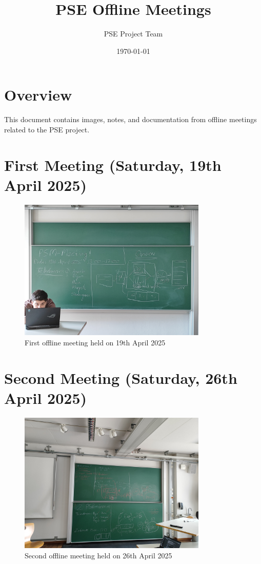 \documentclass{article}
\title{PSE Offline Meetings}
\author{PSE Project Team}
\date{\today}
\begin{document}
\maketitle

\section*{Overview}

This document contains images, notes, and documentation from offline meetings related to the PSE project.

\section*{First Meeting (Saturday, 19th April 2025)}

\begin{figure}[H]
    \centering
    \includegraphics[width=0.8\textwidth]{Documentation/images/Meeting 1.jpg}
    \caption{First offline meeting held on 19th April 2025}
\end{figure}

\section*{Second Meeting (Saturday, 26th April 2025)}

\begin{figure}[H]
    \centering
    \includegraphics[width=0.8\textwidth]{Documentation/images/Meeting 2.jpg}
    \caption{Second offline meeting held on 26th April 2025}
\end{figure}
\end{document}
